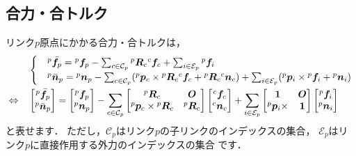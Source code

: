﻿\documentclass[a4paper]{jsarticle}
\begin{document}
\subsection{合力・合トルク}

リンク$p$原点にかかる合力・合トルクは，
\begin{align}
&\begin{cases}
&{}^{p}\bar{\bm{f}}_{p}=
 {}^{p}\bm{f}_{p}
 -\sum_{c\in\mathcal{C}_{p}}{}^{p}\bm{R}_{c}{}^{c}\bm{f}_{c}
 +\sum_{i\in\mathcal{E}_{p}}{}^{p}\bm{f}_{i}
 \\
&{}^{p}\bar{\bm{n}}_{p}=
 {}^{p}\bm{n}_{p}
 -\sum_{c\in\mathcal{C}_{p}}
  ({}^{p}\bm{p}_{c}\times{}^{p}\bm{R}_{c}{}^{c}\bm{f}_{c}+{}^{p}\bm{R}_{c}{}^{c}\bm{n}_{c})
 +\sum_{i\in\mathcal{E}_{p}}
  ({}^{p}\bm{p}_{i}\times{}^{p}\bm{f}_{i}+{}^{p}\bm{n}_{i})
\end{cases} \nonumber \\
\Leftrightarrow\quad&
\left[\begin{array}{@{}c@{}}
 {}^{p}\bar{\bm{f}}_{p} \\ {}^{p}\bar{\bm{n}}_{p}
\end{array}\right]
=\left[\begin{array}{@{}c@{}}
  {}^{p}\bm{f}_{p} \\ {}^{p}\bm{n}_{p}
 \end{array}\right]
-\sum_{c\in\mathcal{C}_{p}}
 \left[\begin{array}{@{}cc@{}}
  {}^{p}\bm{R}_{c} & \bm{O} \\
  {}^{p}\bm{p}_{c}\times{}^{p}\bm{R}_{c} & {}^{p}\bm{R}_{c}
 \end{array}\right]
 \left[\begin{array}{@{}c@{}}
  {}^{c}\bm{f}_{c} \\ {}^{c}\bm{n}_{c}
 \end{array}\right]
+\sum_{i\in\mathcal{E}_{p}}
 \left[\begin{array}{@{}cc@{}}
  \bm{1} & \bm{O} \\
  {}^{p}\bm{p}_{i}\times & \bm{1}
 \end{array}\right]
 \left[\begin{array}{@{}c@{}}
  {}^{p}\bm{f}_{i} \\ {}^{p}\bm{n}_{i}
 \end{array}\right]
\label{eq:force}
\end{align}
と表せます．
ただし，$\mathcal{C}_{p}$はリンク$p$の子リンクのインデックスの集合，
$\mathcal{E}_{p}$はリンク$p$に直接作用する外力のインデックスの集合
です．
\end{document}
